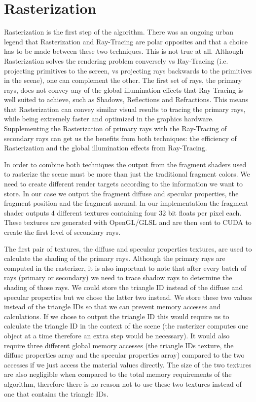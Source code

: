 \section{Rasterization}
\label{section:algorithm-rasterization}

Rasterization is the first step of the algorithm. There was an ongoing urban legend that Rasterization and Ray-Tracing are polar opposites and that a choice has to be made between these two techniques. This is not true at all. Although Rasterization solves the rendering problem conversely vs Ray-Tracing (i.e. projecting primitives to the screen, vs projecting rays backwards to the primitives in the scene), one can complement the other. 
The first set of rays, the primary rays, does not convey any of the global illumination effects that Ray-Tracing is well suited to achieve, such as Shadows, Reflections and Refractions. This means that Rasterization can convey similar visual results to tracing the primary rays, while being extremely faster and optimized in the graphics hardware. Supplementing the Rasterization of primary rays with the Ray-Tracing of secondary rays can get us the benefits from both techniques: the efficiency of Rasterization and the global illumination effects from Ray-Tracing.

\medskip

In order to combine both techniques the output from the fragment shaders used to rasterize the scene must be more than just the traditional fragment colors. We need to create different render targets according to the information we want to store. In our case we output the fragment diffuse and specular properties, the fragment position and the fragment normal. In our implementation the fragment shader outputs 4 different textures containing four 32 bit floats per pixel each. These textures are generated with OpenGL/GLSL and are then sent to CUDA to create the first level of secondary rays.

\medskip

The first pair of textures, the diffuse and specular properties textures, are used to calculate the shading of the primary rays. Although the primary rays are computed in the rasterizer, it is also important to note that after every batch of rays (primary or secondary) we need to trace shadow rays to determine the shading of those rays. We could store the triangle ID instead of the diffuse and specular properties but we chose the latter two instead. We store these two values instead of the triangle IDs so that we can prevent memory accesses and calculations. If we chose to output the triangle ID this would require us to calculate the triangle ID in the context of the scene (the rasterizer computes one object at a time therefore an extra step would be necessary). It would also require three different global memory accesses (the triangle IDs texture, the diffuse properties array and the specular properties array) compared to the two accesses if we just access the material values directly. The size of the two textures are also negligible when compared to the total memory requirements of the algorithm, therefore there is no reason not to use these two textures instead of one that contains the triangle IDs.

